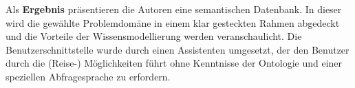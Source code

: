 Als \textbf{Ergebnis} präsentieren die Autoren eine semantischen Datenbank. In dieser wird die gewählte Problemdomäne in einem klar gesteckten Rahmen abgedeckt und die Vorteile der Wissensmodellierung werden veranschaulicht. Die Benutzerschnittstelle wurde durch einen Assistenten umgesetzt, der den Benutzer durch die (Reise-) Möglichkeiten führt ohne Kenntnisse der Ontologie und einer speziellen Abfragesprache zu erfordern.



